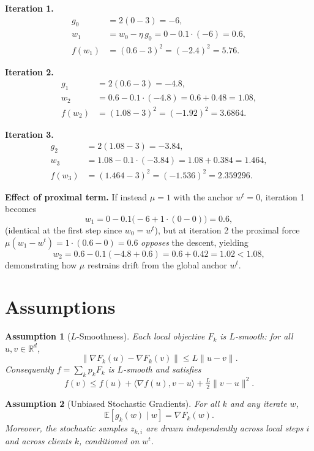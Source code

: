 \documentclass{article}
\newtheorem{assumption}{Assumption}
\begin{document}
\textbf{Iteration 1.}
\begin{align*}
g_0 &= 2(0 - 3) = -6, \\
w_1 &= w_0 - \eta\, g_0 = 0 - 0.1\cdot(-6) = 0.6, \\
f(w_1) &= (0.6 - 3)^2 = (-2.4)^2 = 5.76.
\end{align*}

\textbf{Iteration 2.}
\begin{align*}
g_1 &= 2(0.6 - 3) = -4.8, \\
w_2 &= 0.6 - 0.1\cdot(-4.8) = 0.6 + 0.48 = 1.08, \\
f(w_2) &= (1.08 - 3)^2 = (-1.92)^2 = 3.6864.
\end{align*}

\textbf{Iteration 3.}
\begin{align*}
g_2 &= 2(1.08 - 3) = -3.84, \\
w_3 &= 1.08 - 0.1\cdot(-3.84) = 1.08 + 0.384 = 1.464, \\
f(w_3) &= (1.464 - 3)^2 = (-1.536)^2 = 2.359296.
\end{align*}

\textbf{Effect of proximal term.} If instead $\mu = 1$ with the anchor $w^t = 0$, iteration 1 becomes
\[
w_1 = 0 - 0.1\big(-6 + 1\cdot(0 - 0)\big) = 0.6,
\]
(identical at the first step since $w_{0}=w^t$), but at iteration 2 the proximal force $\mu(w_1 - w^t) = 1\cdot(0.6-0)=0.6$ \emph{opposes} the descent, yielding
\[
w_2 = 0.6 - 0.1(-4.8 + 0.6) = 0.6 + 0.42 = 1.02 < 1.08,
\]
demonstrating how $\mu$ restrains drift from the global anchor $w^t$.

\section*{Assumptions}

\begin{assumption}[$L$-Smoothness]\label{as:smooth}
Each local objective $F_k$ is $L$-smooth: for all $u,v \in \mathbb{R}^d$,
\[
\|\nabla F_k(u) - \nabla F_k(v)\| \le L \|u - v\|.
\]
Consequently $f = \sum_k p_k F_k$ is $L$-smooth and satisfies
\[
f(v) \le f(u) + \langle \nabla f(u), v - u\rangle + \tfrac{L}{2}\|v-u\|^2.
\]
\end{assumption}

\begin{assumption}[Unbiased Stochastic Gradients]\label{as:unbiased}
For all $k$ and any iterate $w$,
\[
\mathbb{E}[g_k(w) \mid w] = \nabla F_k(w).
\]
Moreover, the stochastic samples $z_{k,i}$ are drawn independently across local steps $i$ and across clients $k$, conditioned on $w^t$.
\end{assumption}
\end{document}
